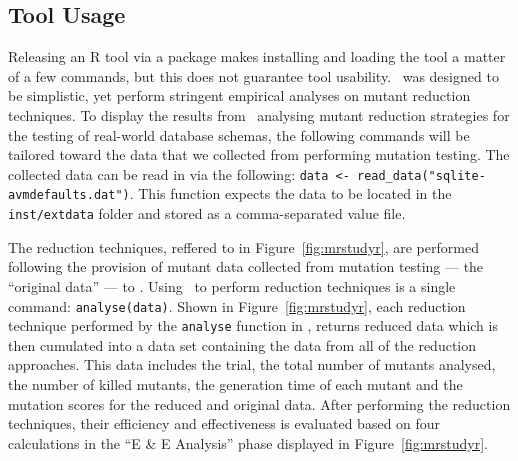 \subsection{Tool Usage}





Releasing an R tool via a package makes installing and loading the tool a matter of a few commands,
but this does not guarantee tool usability. \mr~was designed to be simplistic, yet perform stringent
empirical analyses on mutant reduction techniques. To display the results from \mr~analysing mutant
reduction strategies for the testing of real-world database schemas, the following commands will be
tailored toward the data that we collected from performing mutation testing. The collected data can
be read in via the following: {\small\texttt{data <- read\_data("sqlite-avmdefaults.dat")}}. This
function expects the data to be located in the \texttt{inst/extdata} folder and stored as a
comma-separated value file.






The reduction techniques, reffered to in Figure~\ref{fig:mrstudyr}, are performed following the provision of mutant data collected from mutation testing ---
the ``original data'' --- to \mr. Using \mr~to perform  reduction techniques is a single command:
\texttt{analyse(data)}. Shown in Figure~\ref{fig:mrstudyr},  each reduction technique performed by the \texttt{analyse} function in \mr, returns
reduced data which is then cumulated into a data set containing the data from all of the reduction approaches.
This data includes the trial, the total number of mutants analysed, the number of
killed mutants, the generation time of each mutant and the mutation scores for the reduced and
original data. After performing the reduction techniques, their efficiency and effectiveness is evaluated based
on four calculations in the ``E \& E Analysis'' phase displayed in Figure~\ref{fig:mrstudyr}.

